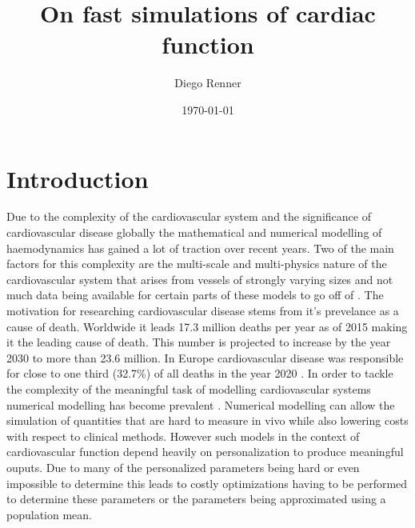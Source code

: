 \documentclass[a4paper, oneside]{discothesis}
\title{On fast simulations of cardiac function}
\author{Diego Renner}
\institute{Dep. of Mathematics \\[2pt]
ETH Zürich}
\date{\today}
\begin{document}
\frontmatter %
\maketitle
\cleardoublepage

\begin{acknowledgements}
	
\end{acknowledgements}


\begin{abstract}
	
\end{abstract}

\tableofcontents

\mainmatter %

\chapter{Introduction}
Due to the complexity of the cardiovascular system and the significance of cardiovascular disease globally the mathematical and numerical modelling of haemodynamics has gained a lot of traction over recent years.
Two of the main factors for this complexity are the multi-scale and multi-physics nature of the cardiovascular system that arises from vessels of strongly varying sizes and not much data being available for certain parts of these models to go off of \cite{quarteroni2016geometric}.
The motivation for researching cardiovascular disease stems from it's prevelance as a cause of death.
Worldwide it leads 17.3 million deaths per year as of 2015 making it the leading cause of death.
This number is projected to increase by the year 2030 to more than 23.6 million. \cite{update2015heart}
In Europe cardiovascular disease was responsible for close to one third (32.7\%) of all deaths in the year 2020 \cite{Coelho2020}.
In order to tackle the complexity of the meaningful task of modelling cardiovascular systems numerical modelling has become prevalent \cite{formaggia2009multiscale,quarteroni2016geometric,black2020p14,el2018investigating,qureshi2014numerical,reichold2009vascular}.
Numerical modelling can allow the simulation of quantities that are hard to measure in vivo while also lowering costs with respect to clinical methods.
However such models in the context of cardiovascular function depend heavily on personalization to produce meaningful ouputs.
Due to many of the personalized parameters being hard or even impossible to determine this leads to costly optimizations having to be performed to determine these parameters or the parameters being approximated using a population mean.
\end{document}
